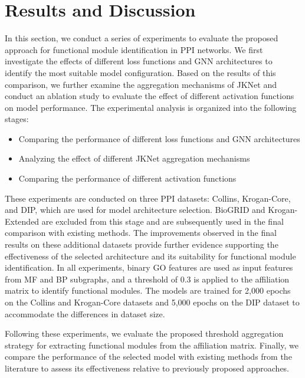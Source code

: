 

\section{Results and Discussion}

In this section, we conduct a series of experiments to evaluate the proposed approach for functional module identification in PPI networks. We first investigate the effects of different loss functions and GNN architectures to identify the most suitable model configuration. Based on the results of this comparison, we further examine the aggregation mechanisms of JKNet and conduct an ablation study to evaluate the effect of different activation functions on model performance. The experimental analysis is organized into the following stages:

\begin{itemize}
	\item Comparing the performance of different loss functions and GNN architectures
	\item Analyzing the effect of different JKNet aggregation mechanisms
	\item Comparing the performance of different activation functions
\end{itemize}

These experiments are conducted on three PPI datasets: Collins, Krogan-Core, and DIP, which are used for model architecture selection. BioGRID and Krogan-Extended are excluded from this stage and are subsequently used in the final comparison with existing methods. The improvements observed in the final results on these additional datasets provide further evidence supporting the effectiveness of the selected architecture and its suitability for functional module identification. In all experiments, binary GO features are used as input features from MF and BP subgraphs, and a threshold of $0.3$ is applied to the affiliation matrix to identify functional modules. The models are trained for 2,000 epochs on the Collins and Krogan-Core datasets and 5,000 epochs on the DIP dataset to accommodate the differences in dataset size.

Following these experiments, we evaluate the proposed threshold aggregation strategy for extracting functional modules from the affiliation matrix. Finally, we compare the performance of the selected model with existing methods from the literature to assess its effectiveness relative to previously proposed approaches.


